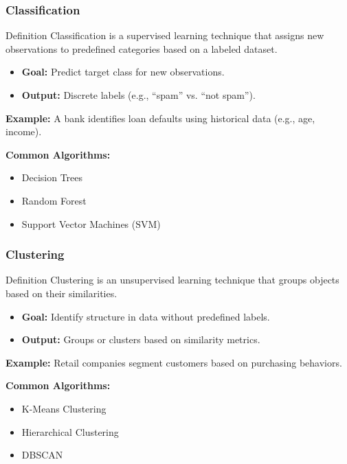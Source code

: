 \documentclass[aspectratio=169]{beamer}
\begin{document}
\begin{frame}[fragile]
    \frametitle{Classification}
    \begin{block}{Definition}
        Classification is a supervised learning technique that assigns new observations to predefined categories based on a labeled dataset.
    \end{block}
    \begin{itemize}
        \item \textbf{Goal:} Predict target class for new observations.
        \item \textbf{Output:} Discrete labels (e.g., ``spam'' vs. ``not spam'').
    \end{itemize}
    \textbf{Example:}  
    A bank identifies loan defaults using historical data (e.g., age, income).
    
    \textbf{Common Algorithms:} 
    \begin{itemize}
        \item Decision Trees
        \item Random Forest
        \item Support Vector Machines (SVM)
    \end{itemize}
\end{frame}

\begin{frame}[fragile]
    \frametitle{Clustering}
    \begin{block}{Definition}
        Clustering is an unsupervised learning technique that groups objects based on their similarities.
    \end{block}
    \begin{itemize}
        \item \textbf{Goal:} Identify structure in data without predefined labels.
        \item \textbf{Output:} Groups or clusters based on similarity metrics.
    \end{itemize}
    \textbf{Example:}  
    Retail companies segment customers based on purchasing behaviors.
    
    \textbf{Common Algorithms:} 
    \begin{itemize}
        \item K-Means Clustering
        \item Hierarchical Clustering
        \item DBSCAN
    \end{itemize}
\end{frame}
\end{document}
